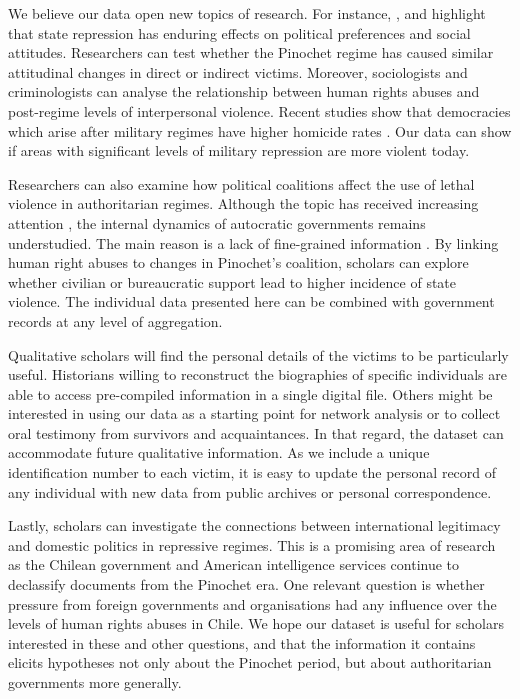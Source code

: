 \documentclass[12pt,a4paper,]{article}
\begin{document}
We believe our data open new topics of research. For instance,
\citet{lupu2017legacy}, \citet{rozenas2017political} and
\citet{zhukov2018stalin} highlight that state repression has enduring
effects on political preferences and social attitudes. Researchers can
test whether the Pinochet regime has caused similar attitudinal changes
in direct or indirect victims. Moreover, sociologists and criminologists
can analyse the relationship between human rights abuses and post-regime
levels of interpersonal violence. Recent studies show that democracies
which arise after military regimes have higher homicide rates
\citep{frantz2018legacy, karstedt2006democracy}. Our data can show if
areas with significant levels of military repression are more violent
today.

Researchers can also examine how political coalitions affect the use of
lethal violence in authoritarian regimes. Although the topic has
received increasing attention
\citep[e.g.,][]{fjelde2010generals, gandhi2007authoritarian, rivera2017authoritarian},
the internal dynamics of autocratic governments remains understudied.
The main reason is a lack of fine-grained information
\citep[16]{ferrara2014assessing}. By linking human right abuses to
changes in Pinochet's coalition, scholars can explore whether civilian
or bureaucratic support lead to higher incidence of state violence. The
individual data presented here can be combined with government records
at any level of aggregation.

Qualitative scholars will find the personal details of the victims to be
particularly useful. Historians willing to reconstruct the biographies
of specific individuals are able to access pre-compiled information in a
single digital file. Others might be interested in using our data as a
starting point for network analysis or to collect oral testimony from
survivors and acquaintances. In that regard, the dataset can accommodate
future qualitative information. As we include a unique identification
number to each victim, it is easy to update the personal record of any
individual with new data from public archives or personal
correspondence.

Lastly, scholars can investigate the connections between international
legitimacy and domestic politics in repressive regimes. This is a
promising area of research as the Chilean government and American
intelligence services continue to declassify documents from the Pinochet
era. One relevant question is whether pressure from foreign governments
and organisations had any influence over the levels of human rights
abuses in Chile. We hope our dataset is useful for scholars interested
in these and other questions, and that the information it contains
elicits hypotheses not only about the Pinochet period, but about
authoritarian governments more generally.

\newpage
\setlength{\parindent}{0cm}
\setlength{\parskip}{6pt}


\end{document}
